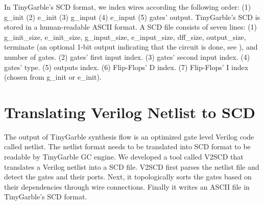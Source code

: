 In TinyGarble's SCD format, we index wires according the following order: (1) g\_init (2) e\_init (3) g\_input (4) e\_input (5) gates' output.
TinyGarble's SCD is stored in a human-readable ASCII format.
A SCD file consists of seven lines: (1) g\_init\_size, e\_init\_size, g\_input\_size, e\_input\_size, dff\_size, output\_size, terminate (an optional 1-bit output indicating that the circuit is done, see ), and number of gates. (2) gates' first input index. (3) gates' second input index. (4) gates' type. (5) outputs index. (6) Flip-Flops' D index. (7) Flip-Flops' I index (chosen from g\_init or e\_init).

\section{Translating Verilog Netlist to SCD}\label{sec:engine-v2sscd}
The output of TinyGarble synthesis flow is an optimized gate level Verilog code called netlist.
The netlist format needs to be translated into SCD format to be readable by TinyGarble GC engine.
We developed a tool called V2SCD that translates a Verilog netlist into a SCD file.
V2SCD first parses the netlist file and detect the gates and their ports.
Next, it topologically sorts the gates based on their dependencies through wire connections.
Finally it writes an ASCII file in TinyGarble's SCD format.


